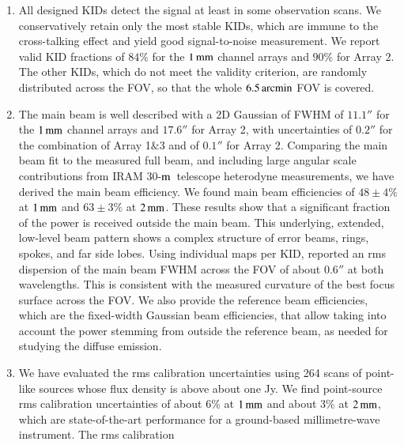 \documentclass[traditionalabstract]{aa}
\newcommand{\trentemetre}{30-$\rm{m}$}
\newcommand{\lp}[1]{#1}
\newcommand{\rev}[1]{#1}
\begin{document}
\begin{enumerate}
\item %
  All designed KIDs detect the
  signal at least in some observation
  scans. We conservatively retain only the most stable KIDs, which are
  immune to the cross-talking effect and yield good signal-to-noise
  measurement. 
  We report valid KID fractions of $84\%$
  for the $1\,\rm{mm}$ channel arrays and $90\%$ for Array 2. The other
  KIDs, which do not meet the validity criterion, are randomly
  distributed across the FOV, so that the whole $6.5\,\rm{arcmin}$ FOV is
  covered.
  \vspace{1mm}
\item %
  The main beam is well described with a 2D
  Gaussian of FWHM of $11.1''$ for the $1\,\rm{mm}$ channel arrays
  and $17.6''$ for Array 2, with uncertainties of $0.2''$ for the
  combination of Array 1$\&$3 and of $0.1''$ for Array 2.
  {\rev Comparing the main beam fit to the measured full beam, and 
    including large angular scale contributions from IRAM
    \trentemetre\ telescope heterodyne measurements, we have derived the
  main beam efficiency.}
  We found main beam
  efficiencies of {\rev $48 \pm 4 \%$} at $1\,\rm{mm}$ and {\rev $63 \pm 3 \%$} at
  $2\,\rm{mm}$.
  {\lp These results show that a significant fraction of the power is received
    outside the main beam. This underlying,
    extended, low-level beam pattern shows a complex structure of error 
    beams, rings, spokes, {\rev and far side lobes}.}
  Using individual maps per KID, \citet{Adam2018} reported an rms
  dispersion of the main beam FWHM across the FOV of about $0.6''$ at
  both wavelengths. This is consistent with the measured curvature of
  the best focus surface across the FOV. 
  {\lp We also provide the reference beam efficiencies, which are the
    fixed-width Gaussian beam efficiencies, that allow taking into
    account the power stemming from outside the reference beam, {\rev
      as needed for studying the diffuse emission.}} 
  \vspace{1mm}
\item %
  We have evaluated the rms calibration uncertainties using 264 
  scans of {\rev point-like} sources whose flux density is above about
  one Jy. We find {\rev point-source} rms calibration
  uncertainties of about $6\%$ at $1\,\rm{mm}$ and about $3\%$ at
  $2\,\rm{mm}$, which are state-of-the-art performance for a
  ground-based millimetre-wave instrument. {\rev The rms calibration
}
\end{enumerate}
\end{document}
